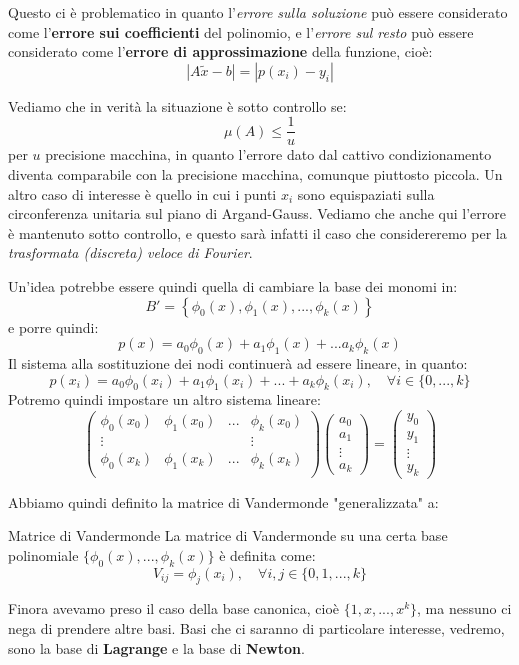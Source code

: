 \documentclass[a4paper,11pt]{article}
\begin{document}
Questo ci è problematico in quanto l'\textit{errore sulla soluzione} può essere considerato come l'\textbf{errore sui coefficienti} del polinomio, e l'\textit{errore sul resto} può essere considerato come l'\textbf{errore di approssimazione} della funzione, cioè:
$$
|A \tilde{x} - b| = |p(x_i) - y_i|
$$

\par\smallskip

Vediamo che in verità la situazione è sotto controllo se:
$$
\mu(A) \leq \frac{1}{u}
$$
per $u$ precisione macchina, in quanto l'errore dato dal cattivo condizionamento diventa comparabile con la precisione macchina, comunque piuttosto piccola.
Un altro caso di interesse è quello in cui i punti $x_i$ sono equispaziati sulla circonferenza unitaria sul piano di Argand-Gauss.
Vediamo che anche qui l'errore è mantenuto sotto controllo, e questo sarà infatti il caso che considereremo per la \textit{trasformata (discreta) veloce di Fourier}.

\par\medskip

Un'idea potrebbe essere quindi quella di cambiare la base dei monomi in:
$$
B' = \left\{ \phi_0(x), \phi_1(x), ..., \phi_k(x) \right\}
$$
e porre quindi:
$$
p(x) = a_0 \phi_0(x) + a_1 \phi_1(x) + ... a_k \phi_k(x)
$$
Il sistema alla sostituzione dei nodi continuerà ad essere lineare, in quanto:
$$
p(x_i) = a_0 \phi_0(x_i) + a_1 \phi_1(x_i) + ... + a_k \phi_k(x_i), \quad \forall i \in \{ 0, ..., k \}
$$
Potremo quindi impostare un altro sistema lineare:
$$
\begin{pmatrix}
	\phi_0(x_0) & \phi_1(x_0) & ... & \phi_k(x_0) \\ 
	\vdots & & & \vdots \\
	\phi_0(x_k) & \phi_1(x_k) & ... & \phi_k(x_k) \\ 
\end{pmatrix}
\begin{pmatrix}
	a_0 \\ a_1 \\ \vdots \\ a_k
\end{pmatrix}
=
\begin{pmatrix}
	y_0 \\ y_1 \\ \vdots \\ y_k
\end{pmatrix}
$$

Abbiamo quindi definito la matrice di Vandermonde "generalizzata" a:
\begin{definition}{Matrice di Vandermonde}
	La matrice di Vandermonde su una certa base polinomiale $\{\phi_0(x), ..., \phi_k(x)\}$ è definita come:
$$
V_{ij} = \phi_j(x_i), \quad \forall i, j \in \{0, 1, ..., k\}
$$
\end{definition}
Finora avevamo preso il caso della base canonica, cioè $\{1, x, ..., x^k\}$, ma nessuno ci nega di prendere altre basi.
Basi che ci saranno di particolare interesse, vedremo, sono la base di \textbf{Lagrange} e la base di \textbf{Newton}.
\end{document}
